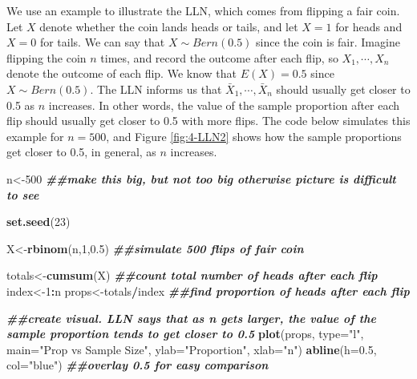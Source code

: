 \documentclass[
]{book}
\newenvironment{Shaded}{\begin{snugshade}}{\end{snugshade}}
\newcommand{\AttributeTok}[1]{\textcolor[rgb]{0.13,0.29,0.53}{#1}}
\newcommand{\DecValTok}[1]{\textcolor[rgb]{0.00,0.00,0.81}{#1}}
\newcommand{\DocumentationTok}[1]{\textcolor[rgb]{0.56,0.35,0.01}{\textbf{\textit{#1}}}}
\newcommand{\FloatTok}[1]{\textcolor[rgb]{0.00,0.00,0.81}{#1}}
\newcommand{\FunctionTok}[1]{\textcolor[rgb]{0.13,0.29,0.53}{\textbf{#1}}}
\newcommand{\NormalTok}[1]{#1}
\newcommand{\OtherTok}[1]{\textcolor[rgb]{0.56,0.35,0.01}{#1}}
\newcommand{\SpecialCharTok}[1]{\textcolor[rgb]{0.81,0.36,0.00}{\textbf{#1}}}
\newcommand{\StringTok}[1]{\textcolor[rgb]{0.31,0.60,0.02}{#1}}
\begin{document}
We use an example to illustrate the LLN, which comes from flipping a fair coin. Let \(X\) denote whether the coin lands heads or tails, and let \(X=1\) for heads and \(X=0\) for tails. We can say that \(X \sim Bern(0.5)\) since the coin is fair. Imagine flipping the coin \(n\) times, and record the outcome after each flip, so \(X_1, \cdots, X_n\) denote the outcome of each flip. We know that \(E(X) = 0.5\) since \(X \sim Bern(0.5)\). The LLN informs us that \(\bar{X}_1, \cdots, \bar{X}_n\) should usually get closer to 0.5 as \(n\) increases. In other words, the value of the sample proportion after each flip should usually get closer to 0.5 with more flips. The code below simulates this example for \(n=500\), and Figure \ref{fig:4-LLN2} shows how the sample proportions get closer to 0.5, in general, as \(n\) increases.

\begin{Shaded}
\begin{Highlighting}[]
\NormalTok{n}\OtherTok{\textless{}{-}}\DecValTok{500} \DocumentationTok{\#\#make this big, but not too big otherwise picture is difficult to see}

\FunctionTok{set.seed}\NormalTok{(}\DecValTok{23}\NormalTok{)}

\NormalTok{X}\OtherTok{\textless{}{-}}\FunctionTok{rbinom}\NormalTok{(n,}\DecValTok{1}\NormalTok{,}\FloatTok{0.5}\NormalTok{) }\DocumentationTok{\#\#simulate 500 flips of fair coin}

\NormalTok{totals}\OtherTok{\textless{}{-}}\FunctionTok{cumsum}\NormalTok{(X) }\DocumentationTok{\#\#count total number of heads after each flip}
\NormalTok{index}\OtherTok{\textless{}{-}}\DecValTok{1}\SpecialCharTok{:}\NormalTok{n}
\NormalTok{props}\OtherTok{\textless{}{-}}\NormalTok{totals}\SpecialCharTok{/}\NormalTok{index }\DocumentationTok{\#\#find proportion of heads after each flip}

\DocumentationTok{\#\#create visual. LLN says that as n gets larger, the value of the sample proportion tends to get closer to 0.5}
\FunctionTok{plot}\NormalTok{(props, }\AttributeTok{type=}\StringTok{"l"}\NormalTok{, }\AttributeTok{main=}\StringTok{"Prop vs Sample Size"}\NormalTok{, }\AttributeTok{ylab=}\StringTok{"Proportion"}\NormalTok{, }\AttributeTok{xlab=}\StringTok{"n"}\NormalTok{)}
\FunctionTok{abline}\NormalTok{(}\AttributeTok{h=}\FloatTok{0.5}\NormalTok{, }\AttributeTok{col=}\StringTok{"blue"}\NormalTok{) }\DocumentationTok{\#\#overlay 0.5 for easy comparison}
\end{Highlighting}
\end{Shaded}
\end{document}
